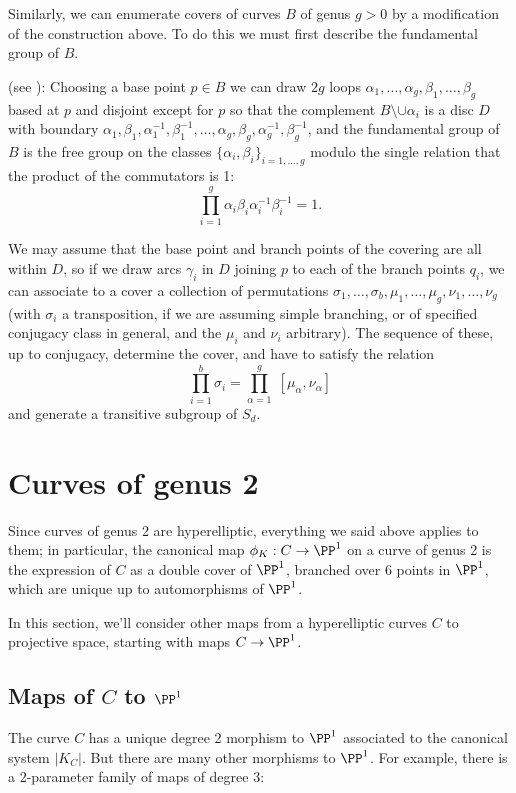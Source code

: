 Similarly, we can enumerate covers of curves $B$ of genus $g>0$ by a modification of the construction above. To do this we must first describe the fundamental group of $B$.
\begin{fact}
  (see \cite[Ch 13]{Munkres}):
Choosing a base point $p \in B$ we can draw $2g$ loops $\alpha_1,\dots,\alpha_{g},\beta_1, \dots, \beta_g$ based at $p$ and disjoint except for $p$ so that the complement $B \setminus \cup \alpha_i$ is a disc $D$ with boundary $\alpha_1, \beta_1, \alpha_1^{-1}, \beta_1^{-1}, \dots, \alpha_g, \beta_g, \alpha_g^{-1}, \beta_g^{-1}$,
and the fundamental group of $B$ is the free group on the classes $\{\alpha_i, \beta_i\}_{i=1,\dots,g}$
modulo the single relation that the product of the commutators is 1:
$$
\prod_{i=1}^g \alpha_i\beta_i\alpha_i^{-1}\beta_i^{-1} = 1.
$$
\end{fact}
We may assume that the base point and branch points of the covering are all within $D$, so if we draw arcs $\gamma_i$ in $D$ joining $p$ to each of the branch points $q_i$, we can associate to a cover a collection of permutations $\sigma_1, \dots, \sigma_b, \mu_1,\dots,\mu_g, \nu_1,\dots,\nu_g$ (with $\sigma_i$ a transposition, if we are assuming simple branching, or of specified conjugacy class in general, and the $\mu_i$ and $\nu_i$ arbitrary). The sequence of these, up to conjugacy, determine the cover, and have to satisfy the relation
$$
\prod_{i=1}^b \sigma_i = \prod_{\alpha=1}^g \; [\mu_\alpha, \nu_\alpha]
$$
and generate a transitive subgroup of $S_d$.


\section{Curves of genus 2}

Since  curves of genus 2 are hyperelliptic, everything we said above applies to them; in particular, the canonical map $\phi_K : C \to \PP^1$ on a curve of genus 2 is the expression of $C$ as a double cover of $\PP^1$, branched over 6 points in $\PP^1$, which are unique up to automorphisms of $\PP^1$. 

In this section, we'll consider other maps from a hyperelliptic curves $C$ to projective space, starting with maps $C \to \PP^1$.

\subsection{Maps of $C$ to $\PP^1$}\label{genus 2 pencil}

The curve $C$ has a unique degree 2 morphism to $\PP^1$  associated to the canonical system $|K_C|$. But there are many other morphisms to $\PP^1$. For example, there is a 2-parameter
family of maps of degree 3:

